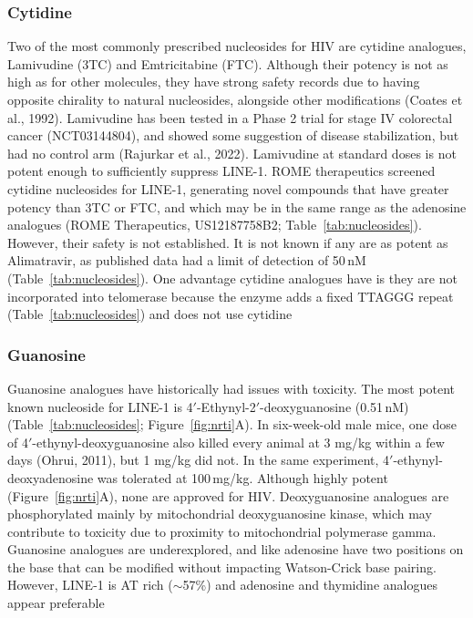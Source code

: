 \documentclass[11pt,twocolumn,twoside]{extarticle}
\begin{document}
\subsubsection{Cytidine}
Two of the most commonly prescribed nucleosides for HIV are cytidine analogues, Lamivudine (3TC) and Emtricitabine (FTC). Although their potency is not as high as for other molecules, they have strong safety records due to having opposite chirality to natural nucleosides, alongside other modifications (Coates et al., 1992). Lamivudine has been tested in a Phase 2 trial for stage IV colorectal cancer (NCT03144804), and showed some suggestion of disease stabilization, but had no control arm (Rajurkar et al., 2022). Lamivudine at standard doses is not potent enough to sufficiently suppress LINE-1. ROME therapeutics screened cytidine nucleosides for LINE-1, generating novel compounds that have greater potency than 3TC or FTC, and which may be in the same range as the adenosine analogues (ROME Therapeutics, US12187758B2; Table~\ref{tab:nucleosides}). However, their safety is not established. It is not known if any are as potent as Alimatravir, as published data had a limit of detection of 50\,nM (Table~\ref{tab:nucleosides}). One advantage cytidine analogues have is they are not incorporated into telomerase because the enzyme adds a fixed TTAGGG repeat (Table~\ref{tab:nucleosides}) and does not use cytidine

\subsubsection{Guanosine}
Guanosine analogues have historically had issues with toxicity. The most potent known nucleoside for LINE-1 is 4$'$-Ethynyl-2$'$-deoxyguanosine (0.51\,nM) (Table~\ref{tab:nucleosides}; Figure~\ref{fig:nrti}A). In six-week-old male mice, one dose of 4$'$-ethynyl-deoxyguanosine also killed every animal at 3 mg/kg within a few days (Ohrui, 2011), but 1 mg/kg did not. In the same experiment, 4$'$-ethynyl-deoxyadenosine was tolerated at 100\,mg/kg. Although highly potent (Figure~\ref{fig:nrti}A), none are approved for HIV. Deoxyguanosine analogues are phosphorylated mainly by mitochondrial deoxyguanosine kinase, which may contribute to toxicity due to proximity to mitochondrial polymerase gamma. Guanosine analogues are underexplored, and like adenosine have two positions on the base that can be modified without impacting Watson-Crick base pairing. However, LINE-1 is AT rich ($\sim$57\%) and adenosine and thymidine analogues appear preferable
\end{document}

